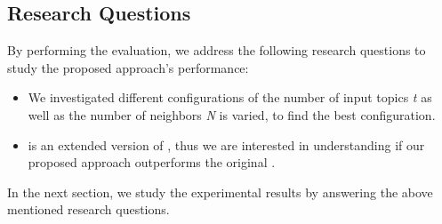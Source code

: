 %
%



\subsection{Research Questions} \label{sec:ResearchQuestions}

By performing the evaluation, we address the following research questions to study the proposed approach's performance:
\begin{itemize}
	\item \rqfirst We investigated different configurations of \TF\ie the number of input topics \emph{t} as well as the number of neighbors \emph{N} is varied, to find the best configuration. %
	
	\item \rqsecond \TFb is an extended version of \MNB, thus we are interested in understanding if our proposed approach outperforms the original \MNB. %
\end{itemize}


In the next section, we study the experimental results by answering the above mentioned research questions.
